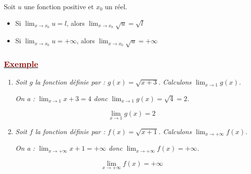 \documentclass[12pt,a4paper]{article}
\begin{document}
Soit $u$ une fonction positive et $x_0$ un réel.

\vspace{0.3cm}

\begin{itemize}
\item Si $\displaystyle \lim_{x \to x_0} u = l$, alors $\displaystyle \lim_{x \to x_0} \sqrt{u} = \sqrt{l}$
\item Si $\displaystyle \lim_{x \to x_0} u = +\infty$, alors $\displaystyle \lim_{x \to x_0} \sqrt{u} = +\infty$
\end{itemize}

\subsubsection*{\underline{\textcolor{darkred}{ Exemple }}} 

\begin{enumerate}
    \item \textit{Soit $g$ la fonction définie par : $g(x) = \sqrt{x + 3}$. Calculons $\displaystyle \lim_{x \to 1} g(x)$.}
    
    \vspace{0.2cm}
    
    \textit{On a : $\displaystyle \lim_{x \to 1} x + 3 = 4$ donc $\displaystyle \lim_{x \to 1} g(x) = \sqrt{4} = 2$.}
    
    \[
    \boxed{\lim_{x \to 1} g(x) = 2}
    \]
\end{enumerate}

\begin{enumerate}
    \setcounter{enumi}{1}
    \item \textit{Soit $f$ la fonction définie par : $f(x) = \sqrt{x + 1}$. Calculons $\displaystyle \lim_{x \to +\infty} f(x)$.}
    
    \vspace{0.2cm}
    
    \textit{On a : $\displaystyle \lim_{x \to +\infty} x + 1 = +\infty$ donc $\displaystyle \lim_{x \to +\infty} f(x) = +\infty$.}
    
    \[
    \boxed{\lim_{x \to +\infty} f(x) = +\infty}
    \]
\end{enumerate}
\end{document}
